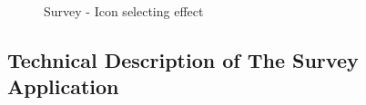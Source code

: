\begin{figure}[H]
{        \label{fig:iconfadingout}
      }
      \caption{Survey - Icon selecting effect}
      \label{fig:thefadingeffect}
    \end{figure}

\subsection{Technical Description of The Survey Application}

